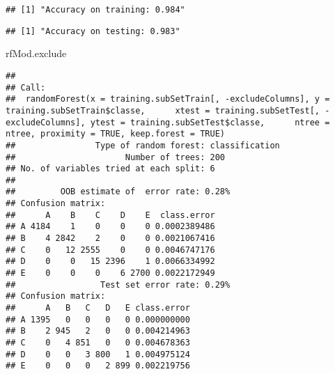 \documentclass[]{article}
\newenvironment{Shaded}{\begin{snugshade}}{\end{snugshade}}
\newcommand{\DecValTok}[1]{\textcolor[rgb]{0.00,0.00,0.81}{#1}}
\newcommand{\KeywordTok}[1]{\textcolor[rgb]{0.13,0.29,0.53}{\textbf{#1}}}
\newcommand{\NormalTok}[1]{#1}
\newcommand{\OperatorTok}[1]{\textcolor[rgb]{0.81,0.36,0.00}{\textbf{#1}}}
\newcommand{\StringTok}[1]{\textcolor[rgb]{0.31,0.60,0.02}{#1}}
\begin{document}
\begin{Shaded}
\end{Shaded}

\begin{verbatim}
## [1] "Accuracy on training: 0.984"
\end{verbatim}

\begin{Shaded}
\end{Shaded}

\begin{verbatim}
## [1] "Accuracy on testing: 0.983"
\end{verbatim}

\begin{Shaded}
\begin{Highlighting}[]
\NormalTok{rfMod.exclude}
\end{Highlighting}
\end{Shaded}

\begin{verbatim}
## 
## Call:
##  randomForest(x = training.subSetTrain[, -excludeColumns], y = training.subSetTrain$classe,      xtest = training.subSetTest[, -excludeColumns], ytest = training.subSetTest$classe,      ntree = ntree, proximity = TRUE, keep.forest = TRUE) 
##                Type of random forest: classification
##                      Number of trees: 200
## No. of variables tried at each split: 6
## 
##         OOB estimate of  error rate: 0.28%
## Confusion matrix:
##      A    B    C    D    E  class.error
## A 4184    1    0    0    0 0.0002389486
## B    4 2842    2    0    0 0.0021067416
## C    0   12 2555    0    0 0.0046747176
## D    0    0   15 2396    1 0.0066334992
## E    0    0    0    6 2700 0.0022172949
##                 Test set error rate: 0.29%
## Confusion matrix:
##      A   B   C   D   E class.error
## A 1395   0   0   0   0 0.000000000
## B    2 945   2   0   0 0.004214963
## C    0   4 851   0   0 0.004678363
## D    0   0   3 800   1 0.004975124
## E    0   0   0   2 899 0.002219756
\end{verbatim}
\end{document}
